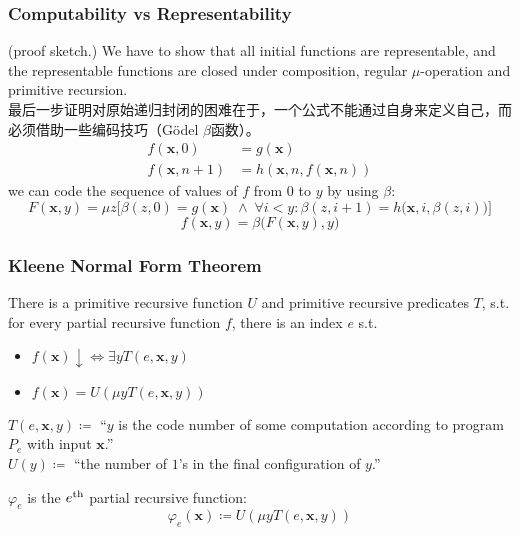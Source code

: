 \documentclass[UTF8,aspectratio=43,11pt,colorlinks,compress,openany]{beamer}%
\begin{document}
\begin{frame}\frametitle{Computability vs Representability}
\begin{center}
\end{center}
(proof sketch.) We have to show that all initial functions are representable, and the representable functions are closed under composition, regular $\mu$-operation and primitive recursion.\\
最后一步证明对原始递归封闭的困难在于，一个公式不能通过自身来定义自己，而必须借助一些编码技巧（G\"odel $\beta$函数）。
		\begin{align*}
		f(\mathbf{x},0)&=g(\mathbf{x})\\
		f(\mathbf{x},n+1)&=h\left(\mathbf{x},n,f(\mathbf{x},n)\right)
		\end{align*}
we can code the sequence of values of $f$ from $0$ to $y$ by using $\beta$:
\[F(\mathbf{x},y)=\mu z\big[\beta(z,0)=g(\mathbf{x})\;\wedge\;\forall i<y:\beta(z,i+1)=h\big(\mathbf{x},i,\beta(z,i)\big)\big]\]
\[f(\mathbf{x},y)=\beta\big(F(\mathbf{x},y),y\big)\]
\end{frame}

\begin{frame}\frametitle{Kleene Normal Form Theorem}
	\begin{theorem}
		There is a primitive recursive function $U$ and primitive recursive predicates $T$, s.t. for every partial recursive function $f$, there is an index $e$ s.t.
		\begin{itemize}
			\item $f(\mathbf{x})\!\downarrow\iff\exists y T(e,\mathbf{x},y)$
			\item $f(\mathbf{x})=U(\mu y T(e,\mathbf{x},y))$
		\end{itemize}
	\end{theorem}
	\begin{block}{}
		$T(e,\mathbf{x}, y)\coloneqq $ ``$y$ is the code	number of some computation according to program $P_e$ with input $\mathbf{x}$.''\\
		$U(y)\coloneqq $ ``the number of $1$'s in the final configuration of $y$.''
	\end{block}
	\begin{definition}
		$\varphi_e$ is the $e\textsuperscript{th}$ partial recursive function:
		\[\varphi_e(\mathbf{x})\coloneqq U(\mu y T(e,\mathbf{x},y))\]
	\end{definition}
\end{frame}
\end{document}
